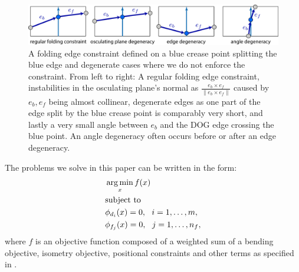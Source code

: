 \begin{figure} [h]
	\centering
	\includegraphics[width=\linewidth]{figures/fold_const_degeneracies}
	\caption{A folding edge constraint defined on a blue crease point splitting the blue edge and degenerate cases where we do not enforce the constraint. From left to right: A regular folding edge constraint, instabilities in the osculating plane's normal as $\frac{e_b \times e_f}{\|e_b \times e_f\|}$ caused by $e_b,e_f$ being almost collinear, degenerate edges as one part of the edge split by the blue crease point is comparably very short, and lastly a very small angle between $e_b$ and the DOG edge crossing the blue point. An angle degeneracy often occurs before or after an edge degeneracy.}
	\label{fig:fold_const_degeneracies}
\end{figure}

The problems we solve in this paper can be written in the form:
\begin{equation} \label{eq:const_opt}
\begin{aligned}
& \operatorname*{arg\,min}_x f(x) \\
& \textrm{subject to} \\
& \phi_{d_i}(x) = 0, \ \  i = 1, \ldots, m, \\
& \phi_{f_j}(x) = 0, \ \  j = 1, \ldots, n_f, \\ 
\end{aligned}
\end{equation}
where $f$ is an objective function composed of a weighted sum of a bending objective, isometry objective, positional constraints and other terms as specified in .

